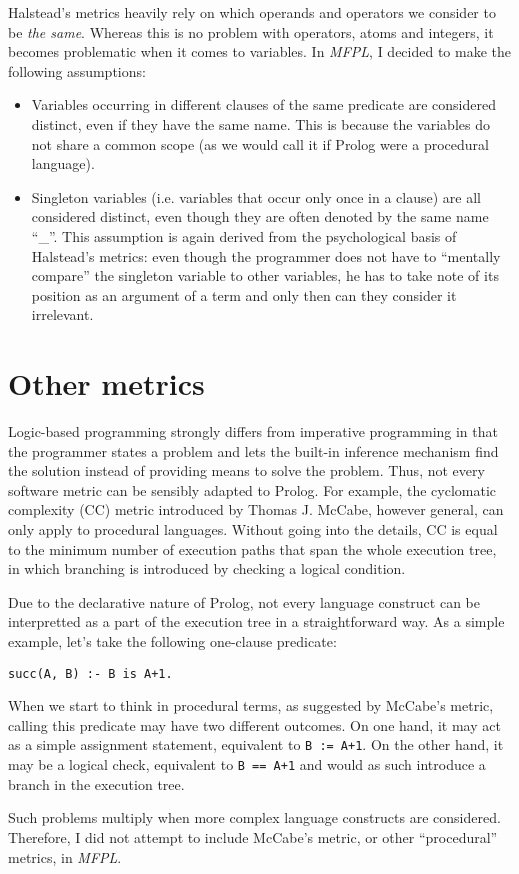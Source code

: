 \documentclass[11pt,a4paper,twoside]{article}
\begin{document}
\begin{multicols}{2}
Halstead's metrics heavily rely on which operands and operators we
consider to be \emph{the same}. Whereas this is no problem with
operators, atoms and integers, it becomes problematic when it comes to
variables. In \emph{MFPL}, I decided to make the following assumptions:
\begin{itemize}
\item Variables occurring in different clauses of the same predicate
  are considered distinct, even if they have the same name. This is
  because the variables do not share a common scope (as we would call
  it if Prolog were a procedural language). 
\item Singleton variables (i.e. variables that occur only once in a
  clause) are all considered distinct, even though they are often
  denoted by the same name ``\_''. This assumption is again derived
  from the psychological basis of Halstead's metrics: even though the
  programmer does not have to ``mentally compare'' the singleton
  variable to other variables, he has to take note of its position as
  an argument of a term and only then can they consider it irrelevant.
\end{itemize}

\section{Other metrics}

Logic-based programming strongly differs from imperative programming
in that the programmer states a problem and lets the built-in
inference mechanism find the solution instead of providing means to
solve the problem. Thus, not every software metric can be sensibly
adapted to Prolog. For example, the cyclomatic complexity (CC) metric
introduced by Thomas J. McCabe\cite{mccabe}, however general, can only
apply to procedural languages. Without going into the details, CC is
equal to the minimum number of execution paths that span the whole
execution tree, in which branching is introduced by checking a logical
condition. 

Due to the declarative nature of Prolog, not every language construct
can be interpretted as a part of the execution tree in a
straightforward way. As a simple example, let's take the following
one-clause predicate:
\begin{center}
\texttt{succ(A, B) :- B is A+1.}
\end{center}
When we start to think in procedural terms, as suggested by McCabe's
metric, calling this predicate may have two different outcomes. On one
hand, it may act as a simple assignment statement, equivalent to
\texttt{B~:=~A+1}. On the other hand, it may be a logical check,
equivalent to \texttt{B~==~A+1} and would as such introduce a branch
in the execution tree. 

Such problems multiply when more complex language constructs are
considered. Therefore, I did not attempt to include McCabe's metric,
or other ``procedural'' metrics, in \emph{MFPL}.

\end{multicols}
\end{document}
